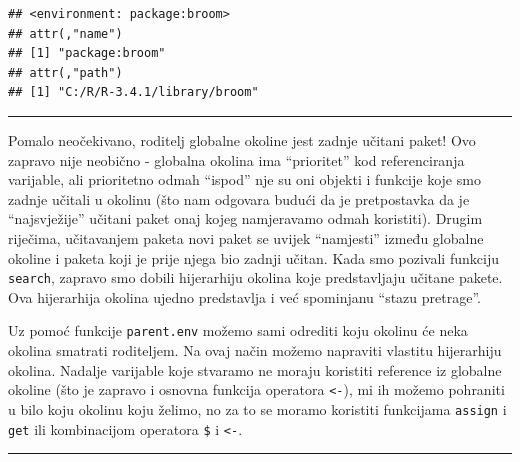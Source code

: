 \documentclass[]{book}
\newenvironment{Shaded}{\begin{snugshade}}{\end{snugshade}}
\newcommand{\KeywordTok}[1]{\textcolor[rgb]{0.13,0.29,0.53}{\textbf{#1}}}
\newcommand{\DecValTok}[1]{\textcolor[rgb]{0.00,0.00,0.81}{#1}}
\newcommand{\StringTok}[1]{\textcolor[rgb]{0.31,0.60,0.02}{#1}}
\newcommand{\CommentTok}[1]{\textcolor[rgb]{0.56,0.35,0.01}{\textit{#1}}}
\newcommand{\NormalTok}[1]{#1}
\theoremstyle{definition}
\theoremstyle{definition}
\theoremstyle{definition}
\theoremstyle{remark}
\begin{document}
\begin{verbatim}
## <environment: package:broom>
## attr(,"name")
## [1] "package:broom"
## attr(,"path")
## [1] "C:/R/R-3.4.1/library/broom"
\end{verbatim}

\begin{center}\rule{0.5\linewidth}{\linethickness}\end{center}

Pomalo neočekivano, roditelj globalne okoline jest zadnje učitani paket!
Ovo zapravo nije neobično - globalna okolina ima ``prioritet'' kod
referenciranja varijable, ali prioritetno odmah ``ispod'' nje su oni
objekti i funkcije koje smo zadnje učitali u okolinu (što nam odgovara
budući da je pretpostavka da je ``najsvježije'' učitani paket onaj kojeg
namjeravamo odmah koristiti). Drugim riječima, učitavanjem paketa novi
paket se uvijek ``namjesti'' između globalne okoline i paketa koji je
prije njega bio zadnji učitan. Kada smo pozivali funkciju
\texttt{search}, zapravo smo dobili hijerarhiju okolina koje
predstavljaju učitane pakete. Ova hijerarhija okolina ujedno predstavlja
i već spominjanu ``stazu pretrage''.

Uz pomoć funkcije \texttt{parent.env} možemo sami odrediti koju okolinu
će neka okolina smatrati roditeljem. Na ovaj način možemo napraviti
vlastitu hijerarhiju okolina. Nadalje varijable koje stvaramo ne moraju
koristiti reference iz globalne okoline (što je zapravo i osnovna
funkcija operatora \texttt{\textless{}-}), mi ih možemo pohraniti u bilo
koju okolinu koju želimo, no za to se moramo koristiti funkcijama
\texttt{assign} i \texttt{get} ili kombinacijom operatora \texttt{\$} i
\texttt{\textless{}-}.

\begin{center}\rule{0.5\linewidth}{\linethickness}\end{center}

\begin{Shaded}
\end{Shaded}
\end{document}
